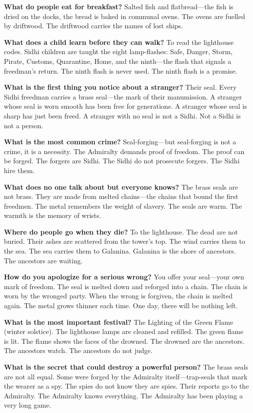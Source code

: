 \vspace{1em}

\begin{almanac}
\textbf{What do people eat for breakfast?} Salted fish and flatbread---the fish is dried on the docks, the bread is baked in communal ovens. The ovens are fuelled by driftwood. The driftwood carries the names of lost ships.

\textbf{What does a child learn before they can walk?} To read the lighthouse codes. Sidhi children are taught the eight lamp-flashes: Safe, Danger, Storm, Pirate, Customs, Quarantine, Home, and the ninth---the flash that signals a freedman's return. The ninth flash is never used. The ninth flash is a promise.

\textbf{What is the first thing you notice about a stranger?} Their seal. Every Sidhi freedman carries a brass seal---the mark of their manumission. A stranger whose seal is worn smooth has been free for generations. A stranger whose seal is sharp has just been freed. A stranger with no seal is not a Sidhi. Not a Sidhi is not a person.

\textbf{What is the most common crime?} Seal-forging---but seal-forging is not a crime, it is a necessity. The Admiralty demands proof of freedom. The proof can be forged. The forgers are Sidhi. The Sidhi do not prosecute forgers. The Sidhi hire them.

\textbf{What does no one talk about but everyone knows?} The brass seals are not brass. They are made from melted chains---the chains that bound the first freedmen. The metal remembers the weight of slavery. The seals are warm. The warmth is the memory of wrists.

\textbf{Where do people go when they die?} To the lighthouse. The dead are not buried. Their ashes are scattered from the tower's top. The wind carries them to the sea. The sea carries them to Galanina. Galanina is the shore of ancestors. The ancestors are waiting.

\textbf{How do you apologize for a serious wrong?} You offer your seal---your own mark of freedom. The seal is melted down and reforged into a chain. The chain is worn by the wronged party. When the wrong is forgiven, the chain is melted again. The metal grows thinner each time. One day, there will be nothing left.

\textbf{What is the most important festival?} The Lighting of the Green Flame (winter solstice). The lighthouse lamps are cleaned and refilled. The green flame is lit. The flame shows the faces of the drowned. The drowned are the ancestors. The ancestors watch. The ancestors do not judge.

\textbf{What is the secret that could destroy a powerful person?} The brass seals are not all equal. Some were forged by the Admiralty itself---trap-seals that mark the wearer as a spy. The spies do not know they are spies. Their reports go to the Admiralty. The Admiralty knows everything. The Admiralty has been playing a very long game.
\end{almanac}

